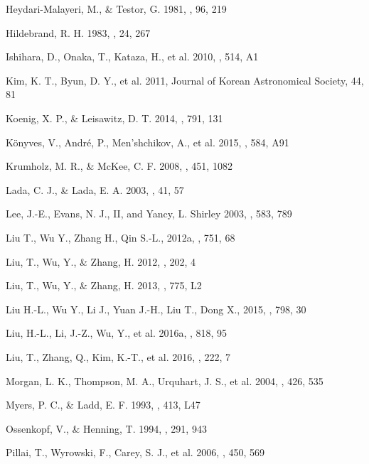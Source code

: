 \documentclass[manuscript]{aastex}
\begin{document}
\begin{thebibliography}{99}
Heydari-Malayeri, M., \& Testor, G.
1981, \aap, 96, 219 

Hildebrand, R. H.
1983, \qjras , 24, 267

Ishihara, D., Onaka, T., Kataza, H., et al.
2010, \aap, 514, A1

Kim, K. T., Byun, D. Y., et al.
2011, Journal of Korean Astronomical Society, 44, 81

Koenig, X. P., \& Leisawitz, D. T.
2014, \apj, 791, 131

K{\"o}nyves, V., Andr{\'e}, P., Men'shchikov, A., et al.
2015, \aap, 584, A91

Krumholz, M. R., \& McKee, C. F.
2008, \nat, 451, 1082

Lada, C. J., \& Lada, E. A.
2003, \araa , 41, 57

Lee, J.-E., Evans, N. J., II, and Yancy, L. Shirley
2003, \apj, 583, 789

Liu T., Wu Y., Zhang H., Qin S.-L.,
2012a, \apj, 751, 68

Liu, T., Wu, Y., \& Zhang, H.
2012, \apjs, 202, 4

Liu, T., Wu, Y., \& Zhang, H.
2013, \apjl, 775, L2

Liu H.-L., Wu Y., Li J., Yuan J.-H., Liu T., Dong X.,
2015, \apj, 798, 30

Liu, H.-L., Li, J.-Z., Wu, Y., et al.
2016a, \apj, 818, 95

Liu, T., Zhang, Q., Kim, K.-T., et al.
2016, \apjs, 222, 7

Morgan, L. K., Thompson, M. A., Urquhart, J. S., et al. 
2004, \aap, 426, 535

Myers, P. C., \& Ladd, E. F.
1993, \apjl , 413, L47

Ossenkopf, V., \& Henning, T.
1994, \aap, 291, 943

Pillai, T., Wyrowski, F., Carey, S. J., et al.
2006, \aap, 450, 569


\end{thebibliography}
\end{document}
